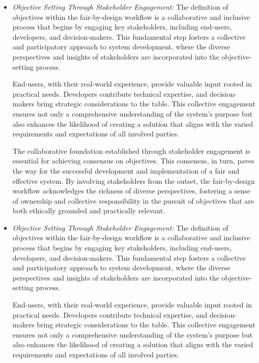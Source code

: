 \documentclass[12pt,a4paper,openright,twoside]{book}
\begin{document}
\begin{itemize}

    \item \emph{Objective Setting Through Stakeholder Engagement:} The definition of objectives within the fair-by-design workflow is a collaborative and inclusive process that begins by engaging key stakeholders, including end-users, developers, and decision-makers. This fundamental step fosters a collective and participatory approach to system development, where the diverse perspectives and insights of stakeholders are incorporated into the objective-setting process.

    End-users, with their real-world experience, provide valuable input rooted in practical needs. Developers contribute technical expertise, and decision-makers bring strategic considerations to the table. This collective engagement ensures not only a comprehensive understanding of the system's purpose but also enhances the likelihood of creating a solution that aligns with the varied requirements and expectations of all involved parties.

    The collaborative foundation established through stakeholder engagement is essential for achieving consensus on objectives. This consensus, in turn, paves the way for the successful development and implementation of a fair and effective system. By involving stakeholders from the outset, the fair-by-design workflow acknowledges the richness of diverse perspectives, fostering a sense of ownership and collective responsibility in the pursuit of objectives that are both ethically grounded and practically relevant.\item \emph{Objective Setting Through Stakeholder Engagement:} The definition of objectives within the fair-by-design workflow is a collaborative and inclusive process that begins by engaging key stakeholders, including end-users, developers, and decision-makers. This fundamental step fosters a collective and participatory approach to system development, where the diverse perspectives and insights of stakeholders are incorporated into the objective-setting process.

    End-users, with their real-world experience, provide valuable input rooted in practical needs. Developers contribute technical expertise, and decision-makers bring strategic considerations to the table. This collective engagement ensures not only a comprehensive understanding of the system's purpose but also enhances the likelihood of creating a solution that aligns with the varied requirements and expectations of all involved parties.


\end{itemize}
\end{document}
